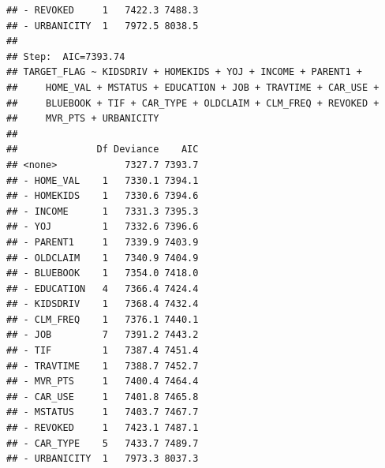 \documentclass[]{article}
\begin{document}
\begin{verbatim}
## - REVOKED     1   7422.3 7488.3
## - URBANICITY  1   7972.5 8038.5
## 
## Step:  AIC=7393.74
## TARGET_FLAG ~ KIDSDRIV + HOMEKIDS + YOJ + INCOME + PARENT1 + 
##     HOME_VAL + MSTATUS + EDUCATION + JOB + TRAVTIME + CAR_USE + 
##     BLUEBOOK + TIF + CAR_TYPE + OLDCLAIM + CLM_FREQ + REVOKED + 
##     MVR_PTS + URBANICITY
## 
##              Df Deviance    AIC
## <none>            7327.7 7393.7
## - HOME_VAL    1   7330.1 7394.1
## - HOMEKIDS    1   7330.6 7394.6
## - INCOME      1   7331.3 7395.3
## - YOJ         1   7332.6 7396.6
## - PARENT1     1   7339.9 7403.9
## - OLDCLAIM    1   7340.9 7404.9
## - BLUEBOOK    1   7354.0 7418.0
## - EDUCATION   4   7366.4 7424.4
## - KIDSDRIV    1   7368.4 7432.4
## - CLM_FREQ    1   7376.1 7440.1
## - JOB         7   7391.2 7443.2
## - TIF         1   7387.4 7451.4
## - TRAVTIME    1   7388.7 7452.7
## - MVR_PTS     1   7400.4 7464.4
## - CAR_USE     1   7401.8 7465.8
## - MSTATUS     1   7403.7 7467.7
## - REVOKED     1   7423.1 7487.1
## - CAR_TYPE    5   7433.7 7489.7
## - URBANICITY  1   7973.3 8037.3
\end{verbatim}
\end{document}
